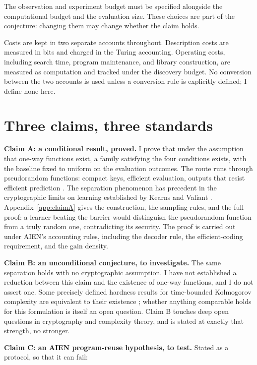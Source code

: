\documentclass[11pt]{article}
\begin{document}
The observation and experiment budget must be specified alongside the computational budget and the evaluation size. These choices are part of the conjecture: changing them may change whether the claim holds.

Costs are kept in two separate accounts throughout. Description costs are measured in bits and charged in the Turing accounting. Operating costs, including search time, program maintenance, and library construction, are measured as computation and tracked under the discovery budget. No conversion between the two accounts is used unless a conversion rule is explicitly defined; I define none here.

\section*{Three claims, three standards}

\textbf{Claim A: a conditional result, proved.} I prove that under the assumption that one-way functions exist, a family satisfying the four conditions exists, with the baseline fixed to uniform on the evaluation outcomes. The route runs through pseudorandom functions: compact keys, efficient evaluation, outputs that resist efficient prediction \cite{ggm1986}. The separation phenomenon has precedent in the cryptographic limits on learning established by Kearns and Valiant \cite{kv1994}. Appendix~\ref{app:claimA} gives the construction, the sampling rules, and the full proof: a learner beating the barrier would distinguish the pseudorandom function from a truly random one, contradicting its security. The proof is carried out under AIEN's accounting rules, including the decoder rule, the efficient-coding requirement, and the gain density.

\textbf{Claim B: an unconditional conjecture, to investigate.} The same separation holds with no cryptographic assumption. I have not established a reduction between this claim and the existence of one-way functions, and I do not assert one. Some precisely defined hardness results for time-bounded Kolmogorov complexity are equivalent to their existence \cite{liupass2020}; whether anything comparable holds for this formulation is itself an open question. Claim B touches deep open questions in cryptography and complexity theory, and is stated at exactly that strength, no stronger.

\textbf{Claim C: an AIEN program-reuse hypothesis, to test.} Stated as a protocol, so that it can fail:
\end{document}
